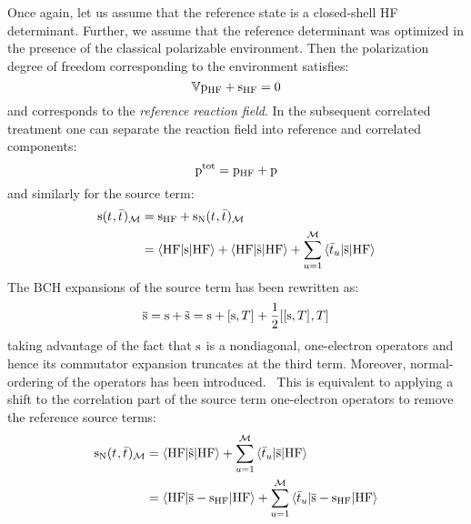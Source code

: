 Once again, let us assume that the reference state is a closed-shell
\acrshort{HF} determinant. Further, we assume that the reference determinant
was optimized in the presence of the classical polarizable environment.
Then the polarization degree of freedom corresponding to the environment
satisfies:
\begin{equation}
  \mathbb{V}\mathrm{p}_\mathrm{HF} + \mathrm{s}_\mathrm{HF} = 0
\end{equation}
and corresponds to the \emph{reference reaction field}.
In the subsequent correlated treatment one can separate the reaction
field into reference and correlated components:
\begin{equation}
  \mathrm{p}^\mathrm{tot} = \mathrm{p}_\mathrm{HF} + \mathrm{p}
\end{equation}
and similarly for the source term:
\begin{equation}
  \begin{aligned}
    \mathrm{s}(t_{}, \bar{t}_{})_\mathcal{M} &= \mathrm{s}_\mathrm{HF} + \mathrm{s}_{\mathrm{N}}(t_{}, \bar{t}_{})_\mathcal{M} \\
                     &=
    \braket{\mathrm{HF} | \mathrm{s} | \mathrm{HF}}
  + \braket{\mathrm{HF} | \tilde{\mathrm{s}} | \mathrm{HF}}
  + \sum_{u=1}^{\mathcal{M}}\braket{\bar{t}_{u} | \overline{\mathrm{s}} | \mathrm{HF}}
  \end{aligned}
\end{equation}
The \acrshort{BCH} expansions of the source term has been rewritten as:
\begin{equation}
  \overline{\mathrm{s}} = \mathrm{s} + \tilde{\mathrm{s}} = \mathrm{s} + [ \mathrm{s}, T ]^{}
  + \frac{1}{2}[ [ \mathrm{s}, T ]^{}, T ]^{}
\end{equation}
taking advantage of the fact that $\mathrm{s}$ is a
nondiagonal, one-electron operators and hence its commutator
expansion truncates at the third term. Moreover, normal-ordering of the
operators has been introduced.~\autocite{Crawford2000-ey, Shavitt2009-mr}
This is equivalent to applying a shift to the correlation part of the
source term one-electron operators to remove the reference source terms:
\begin{equation}
  \begin{aligned}
    \mathrm{s}_{\mathrm{N}}(t_{}, \bar{t}_{})_\mathcal{M}
  &=
   \braket{\mathrm{HF} | \tilde{\mathrm{s}} | \mathrm{HF}}
  + \sum_{u=1}^{\mathcal{M}}\braket{\bar{t}_{u} | \overline{\mathrm{s}} | \mathrm{HF}} \\
  &=
    \braket{\mathrm{HF} | \overline{\mathrm{s}} - \mathrm{s}_\mathrm{HF} | \mathrm{HF}}
  + \sum_{u=1}^{\mathcal{M}}\braket{\bar{t}_{u} | \overline{\mathrm{s}} - \mathrm{s}_\mathrm{HF} | \mathrm{HF}}
  \end{aligned}
\end{equation}

